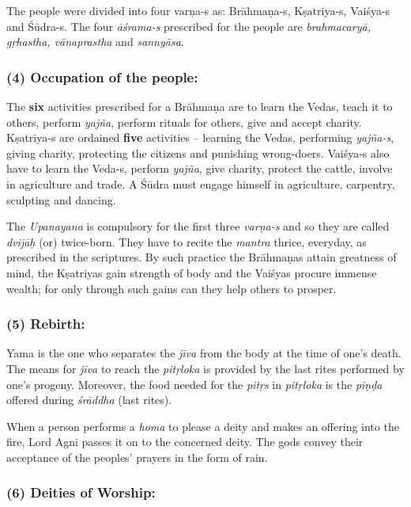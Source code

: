 \vskip -7.5pt

The people were divided into four varņa-s as: Brāhmaṇa-s, Kṣatriya-s, Vaiśya-s and Śūdra-s. The four \textit{āśrama-s} prescribed for the people are \textit{brahmacaryā, gṛhastha, vānaprastha} and \textit{sannyāsa}.


\subsubsection*{(4) Occupation of the people:}

\vskip -7pt

The \textbf{six} activities prescribed for a Brāhmaṇa are to learn the Vedas, teach it to others, perform \textit{yajña}, perform rituals for others, give and accept charity. Kṣatriya-s are ordained \textbf{five} activities – learning the Vedas, performing \textit{yajña-s}, giving charity, protecting the citizens and punishing wrong-doers. Vaiśya-s also have to learn the Veda-s, perform \textit{yajña}, give charity, protect the cattle, involve in agriculture and trade. A Śūdra must engage himself in agriculture, carpentry, sculpting and dancing.

The \textit{Upanayana} is compulsory for the first three \textit{varṇa-s} and so they are called \textit{dvijāḥ} (or) twice-born. They have to recite the \textit{mantra} thrice, everyday, as prescribed in the scriptures. By such practice the Brāhmaṇas attain greatness of mind, the Kṣatriyas gain strength of body and the Vaiśyas procure immense wealth; for only through such gains can they help others to prosper.


\subsubsection*{(5) Rebirth:}

\vskip -8pt

Yama is the one who separates the \textit{jīva} from the body at the time of one’s death. The means for \textit{jīva} to reach the \textit{pitṛloka} is provided by the last rites performed by one’s progeny. Moreover, the food needed for the \textit{pitṛs} in \textit{pitṛloka} is the \textit{piṇḍa} offered during \textit{śrāddha} (last rites).

When a person performs a \textit{homa} to please a deity and makes an offering into the fire, Lord Agni passes it on to the concerned deity. The gods convey their acceptance of the peoples’ prayers in the form of rain.


\subsubsection*{(6) Deities of Worship:}

